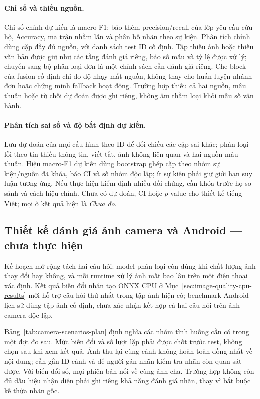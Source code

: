 \paragraph{Chỉ số và thiếu nguồn.} Chỉ số chính dự kiến là macro-F1; báo thêm precision/recall của lớp yêu cầu cứu hộ, Accuracy, ma trận nhầm lẫn và phân bố nhãn theo sự kiện. Phân tích chính dùng cặp đầy đủ nguồn, với danh sách test ID cố định. Tập thiếu ảnh hoặc thiếu văn bản được giữ như các tầng đánh giá riêng, báo số mẫu và tỷ lệ được xử lý; chuyển sang bộ phân loại đơn là một chính sách cần đánh giá riêng. Che block của fusion cố định chỉ đo độ nhạy mất nguồn, không thay cho huấn luyện nhánh đơn hoặc chứng minh fallback hoạt động. Trường hợp thiếu cả hai nguồn, mâu thuẫn hoặc từ chối dự đoán được ghi riêng, không âm thầm loại khỏi mẫu số vận hành.

\paragraph{Phân tích sai số và độ bất định dự kiến.} Lưu dự đoán của mọi cấu hình theo ID để đối chiếu các cặp sai khác; phân loại lỗi theo tin thiếu thông tin, viết tắt, ảnh không liên quan và hai nguồn mâu thuẫn. Hiệu macro-F1 dự kiến dùng bootstrap ghép cặp theo nhóm sự kiện/nguồn đã khóa, báo CI và số nhóm độc lập; ít sự kiện phải giữ giới hạn suy luận tương ứng. Nếu thực hiện kiểm định nhiều đối chứng, cần khóa trước họ so sánh và cách hiệu chỉnh. Chưa có dự đoán, CI hoặc $p$-value cho thiết kế tiếng Việt; mọi ô kết quả hiện là \emph{Chưa đo}.

\subsection{Thiết kế đánh giá ảnh camera và Android --- chưa thực hiện}\label{sec:camera-evaluation-plan}
Kế hoạch mở rộng tách hai câu hỏi: model phân loại còn đúng khi chất lượng ảnh thay đổi hay không, và mỗi runtime xử lý ảnh mất bao lâu trên một điện thoại xác định. Kết quả biến đổi nhân tạo ONNX CPU ở Mục~\ref{sec:image-quality-cpu-results} mới hỗ trợ câu hỏi thứ nhất trong tập ảnh hiện có; benchmark Android lịch sử dùng tập ảnh cố định, chưa xác nhận kết hợp cả hai câu hỏi trên ảnh camera độc lập.

Bảng~\ref{tab:camera-scenarios-plan} định nghĩa các nhóm tình huống cần có trong một đợt đo sau. Mức biến đổi và số lượt lặp phải được chốt trước test, không chọn sau khi xem kết quả. Ảnh thu lại cùng cảnh không hoàn toàn đồng nhất về nội dung; cần gắn ID cảnh và để người gán nhãn kiểm tra nhãn còn quan sát được. Với biến đổi số, mọi phiên bản nối về cùng ảnh cha. Trường hợp không còn đủ dấu hiệu nhận diện phải ghi riêng khả năng đánh giá nhãn, thay vì bắt buộc kế thừa nhãn gốc.

